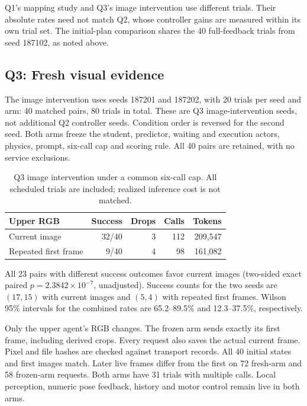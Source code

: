 Q1's mapping study and Q3's image intervention use different trials. Their absolute rates need not match Q2, whose controller gains are measured within its own trial set. The initial-plan comparison shares the 40 full-feedback trials from seed 187102, as noted above.

\subsection{Q3: Fresh visual evidence}
\label{sec:fresh-evidence}
The image intervention uses seeds 187201 and 187202, with 20 trials per seed and arm: 40 matched pairs, 80 trials in total. These are Q3 image-intervention seeds, not additional Q2 controller seeds. Condition order is reversed for the second seed. Both arms freeze the student, predictor, waiting and execution actors, physics, prompt, six-call cap and scoring rule. All 40 pairs are retained, with no service exclusions.

\begin{table}[h]
\centering\small
\setlength{\tabcolsep}{3pt}
\begin{tabular}{lrrrr}
\toprule
Upper RGB & Success & Drops & Calls & Tokens\\
\midrule
Current image & 32/40 & 3 & 112 & 209,547\\
Repeated first frame & 9/40 & 4 & 98 & 161,082\\
\bottomrule
\end{tabular}
\caption{Q3 image intervention under a common six-call cap. All scheduled trials are included; realized inference cost is not matched.}
\label{tab:confirmation-image}
\end{table}

All 23 pairs with different success outcomes favor current images (two-sided exact paired $p=2.3842\times10^{-7}$, unadjusted). Success counts for the two seeds are $(17,15)$ with current images and $(5,4)$ with repeated first frames. Wilson 95\% intervals for the combined rates are 65.2--89.5\% and 12.3--37.5\%, respectively.

Only the upper agent's RGB changes. The frozen arm sends exactly its first frame, including derived crops. Every request also saves the actual current frame. Pixel and file hashes are checked against transport records. All 40 initial states and first images match. Later live frames differ from the first on 72 fresh-arm and 58 frozen-arm requests. Both arms have 31 trials with multiple calls. Local perception, numeric pose feedback, history and motor control remain live in both arms.

